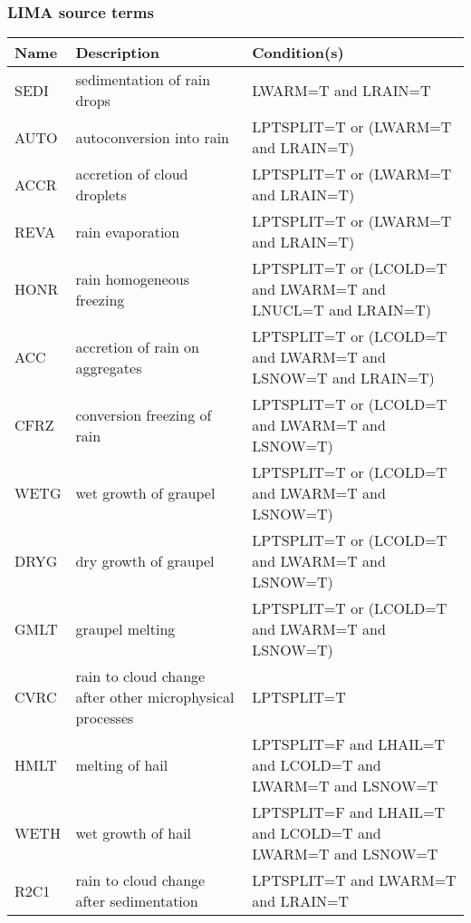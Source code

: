 \subsubsection{LIMA source terms}

\begin{longtable} {|p{}|p{}|p{}|}
\hline
Name & Description & Condition(s) \\
\hline \hline
\endhead
SEDI   & sedimentation of rain drops                              & LWARM=T and LRAIN=T \\\hline
AUTO   & autoconversion into rain                                 & LPTSPLIT=T or (LWARM=T and LRAIN=T) \\\hline
ACCR   & accretion of cloud droplets                              & LPTSPLIT=T or (LWARM=T and LRAIN=T) \\\hline
REVA   & rain evaporation                                         & LPTSPLIT=T or (LWARM=T and LRAIN=T) \\\hline
HONR   & rain homogeneous freezing                                & LPTSPLIT=T or (LCOLD=T and LWARM=T and LNUCL=T and LRAIN=T) \\\hline
ACC    & accretion of rain on aggregates                          & LPTSPLIT=T or (LCOLD=T and LWARM=T and LSNOW=T and LRAIN=T) \\\hline
CFRZ   & conversion freezing of rain                              & LPTSPLIT=T or (LCOLD=T and LWARM=T and LSNOW=T) \\\hline
WETG   & wet growth of graupel                                    & LPTSPLIT=T or (LCOLD=T and LWARM=T and LSNOW=T) \\\hline
DRYG   & dry growth of graupel                                    & LPTSPLIT=T or (LCOLD=T and LWARM=T and LSNOW=T) \\\hline
GMLT   & graupel melting                                          & LPTSPLIT=T or (LCOLD=T and LWARM=T and LSNOW=T) \\\hline
CVRC   & rain to cloud change after other microphysical processes & LPTSPLIT=T \\\hline
HMLT   & melting of hail                                          & LPTSPLIT=F and LHAIL=T and LCOLD=T and LWARM=T and LSNOW=T \\\hline
WETH   & wet growth of hail                                       & LPTSPLIT=F and LHAIL=T and LCOLD=T and LWARM=T and LSNOW=T \\\hline
R2C1   & rain to cloud change after sedimentation                 & LPTSPLIT=T and LWARM=T and LRAIN=T \\\hline

\end{longtable}
